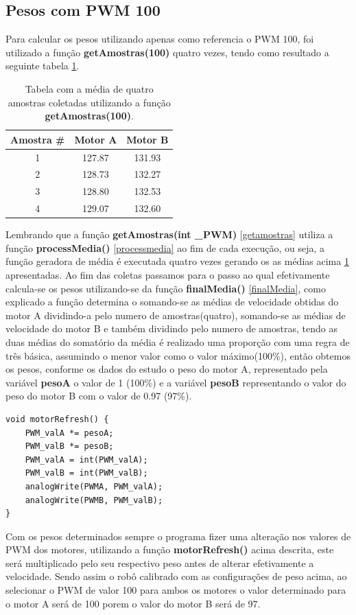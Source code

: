 \documentclass[a4paper,12pt,portuguese]{ufms-cpcx}
\begin{document}
\subsection{Pesos com PWM 100} \label{calib100}
Para calcular os pesos utilizando apenas como referencia o PWM 100, foi utilizado a função \textbf{getAmostras(100)} quatro vezes, tendo como resultado a seguinte tabela \ref{Tab:calib100}.
\begin{table}[!h]
	\renewcommand{\arraystretch}{1.3}
	\centering
	\begin{tabular}{|c|cc|}
		\hline
		Amostra \# & Motor A & Motor B \\ \hline
		    1      & 127.87  & 131.93  \\
		    2      & 128.73  & 132.27  \\
		    3      & 128.80  & 132.53  \\
		    4      & 129.07  & 132.60  \\ \hline
	\end{tabular}
	\caption[Tabela de amotas PWM 100]{Tabela com a média de quatro amostras coletadas utilizando a função \textbf{getAmostras(100)}.}
	\label{Tab:calib100}
\end{table}
Lembrando que a função \textbf{getAmostras(int \_PWM)} \ref{getamostras} utiliza a função \textbf{processMedia()} \ref{processmedia} ao fim de cada execução, ou seja, a função geradora de média é executada quatro vezes gerando os as médias acima \ref{Tab:calib100} apresentadas.
Ao fim das coletas passamos para o passo ao qual efetivamente calcula-se os pesos utilizando-se da função \textbf{finalMedia()} \ref{finalMedia}, como explicado a função determina o somando-se as médias de velocidade obtidas do motor A dividindo-a pelo numero de amostras(quatro), somando-se as médias de velocidade do motor B e também dividindo pelo numero de amostras, tendo as duas médias do somatório da média é realizado uma proporção com uma regra de três básica, assumindo o menor valor como o valor máximo(100\%), então obtemos os pesos, conforme os dados do estudo o peso do motor A, representado pela variável \textbf{pesoA} o valor de 1 (100\%) e a variável \textbf{pesoB} representando o valor do peso do motor B com o valor de 0.97 (97\%).
\begin{lstlisting}
void motorRefresh() {
	PWM_valA *= pesoA;
	PWM_valB *= pesoB;
	PWM_valA = int(PWM_valA);
	PWM_valB = int(PWM_valB);
	analogWrite(PWMA, PWM_valA);
	analogWrite(PWMB, PWM_valB);
}
\end{lstlisting}
Com os pesos determinados sempre o programa fizer uma alteração nos valores de PWM dos motores, utilizando a função \textbf{motorRefresh()} acima descrita, este será multiplicado pelo seu respectivo peso antes de alterar efetivamente a velocidade. Sendo assim o robô calibrado com as configurações de peso acima, ao selecionar o PWM de valor 100 para ambos os motores o valor determinado para o motor A será de 100 porem o valor do motor B será de 97.
\end{document}
